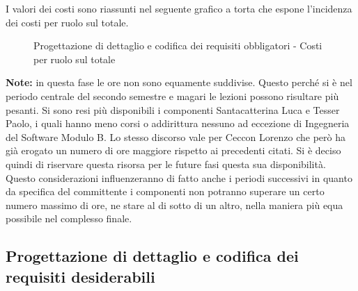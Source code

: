 			\noindent
			I valori dei costi sono riassunti nel seguente grafico a torta che espone l’incidenza dei costi per ruolo sul totale.
			\begin{center}
				\begin{figure}[htbp]
				\vspace{0.8cm}
				\caption{Progettazione di dettaglio e codifica dei requisiti obbligatori - Costi per ruolo sul totale}
				\end{figure}
			\end{center}
		\noindent
		\textbf{Note:} in questa fase le ore non sono equamente suddivise. Questo perché si è nel periodo centrale del secondo semestre e magari le lezioni possono risultare più pesanti. Si sono resi più disponibili i componenti Santacatterina Luca e Tesser Paolo, i quali hanno meno corsi o addirittura nessuno ad eccezione di Ingegneria del Software Modulo B. Lo stesso discorso vale per Ceccon Lorenzo che però ha già erogato un numero di ore maggiore rispetto ai precedenti citati. Si è deciso quindi di riservare questa risorsa per le future fasi questa sua disponibilità. \\
		Questo considerazioni influenzeranno di fatto anche i periodi successivi in quanto da specifica del committente\gloss{} i componenti non potranno superare un certo numero massimo di ore, ne stare al di sotto di un altro, nella maniera più equa possibile nel complesso finale.
	
	\newpage
	\subsection{Progettazione di dettaglio e codifica dei requisiti desiderabili} %
	\label{sub:progettazione_di_dettaglio_e_codifica_dei_requisiti_desiderabili}
